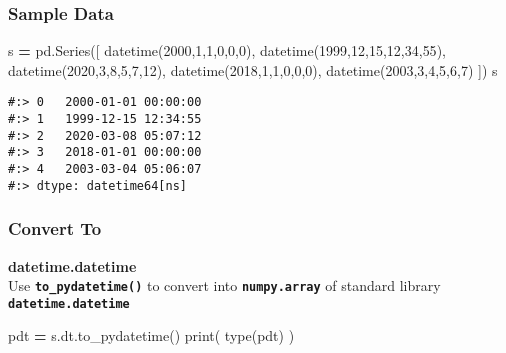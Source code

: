 \documentclass[
]{book}
\newenvironment{Shaded}{\begin{snugshade}}{\end{snugshade}}
\newcommand{\BuiltInTok}[1]{#1}
\newcommand{\DecValTok}[1]{\textcolor[rgb]{0.06,0.06,0.06}{#1}}
\newcommand{\NormalTok}[1]{#1}
\newcommand{\OperatorTok}[1]{\textcolor[rgb]{0.43,0.43,0.43}{\textbf{#1}}}
\begin{document}
\hypertarget{sample-data-5}{%
\subsubsection{Sample Data}\label{sample-data-5}}

\begin{Shaded}
\begin{Highlighting}[]
\NormalTok{s }\OperatorTok{=}\NormalTok{ pd.Series([}
\NormalTok{    datetime(}\DecValTok{2000}\NormalTok{,}\DecValTok{1}\NormalTok{,}\DecValTok{1}\NormalTok{,}\DecValTok{0}\NormalTok{,}\DecValTok{0}\NormalTok{,}\DecValTok{0}\NormalTok{),}
\NormalTok{    datetime(}\DecValTok{1999}\NormalTok{,}\DecValTok{12}\NormalTok{,}\DecValTok{15}\NormalTok{,}\DecValTok{12}\NormalTok{,}\DecValTok{34}\NormalTok{,}\DecValTok{55}\NormalTok{),}
\NormalTok{    datetime(}\DecValTok{2020}\NormalTok{,}\DecValTok{3}\NormalTok{,}\DecValTok{8}\NormalTok{,}\DecValTok{5}\NormalTok{,}\DecValTok{7}\NormalTok{,}\DecValTok{12}\NormalTok{),}
\NormalTok{    datetime(}\DecValTok{2018}\NormalTok{,}\DecValTok{1}\NormalTok{,}\DecValTok{1}\NormalTok{,}\DecValTok{0}\NormalTok{,}\DecValTok{0}\NormalTok{,}\DecValTok{0}\NormalTok{),}
\NormalTok{    datetime(}\DecValTok{2003}\NormalTok{,}\DecValTok{3}\NormalTok{,}\DecValTok{4}\NormalTok{,}\DecValTok{5}\NormalTok{,}\DecValTok{6}\NormalTok{,}\DecValTok{7}\NormalTok{)}
\NormalTok{])}
\NormalTok{s}
\end{Highlighting}
\end{Shaded}

\begin{verbatim}
#:> 0   2000-01-01 00:00:00
#:> 1   1999-12-15 12:34:55
#:> 2   2020-03-08 05:07:12
#:> 3   2018-01-01 00:00:00
#:> 4   2003-03-04 05:06:07
#:> dtype: datetime64[ns]
\end{verbatim}

\hypertarget{convert-to}{%
\subsubsection{Convert To}\label{convert-to}}

\textbf{datetime.datetime}\\
Use \textbf{\texttt{to\_pydatetime()}} to convert into \textbf{\texttt{numpy.array}} of standard library \textbf{\texttt{datetime.datetime}}

\begin{Shaded}
\begin{Highlighting}[]
\NormalTok{pdt  }\OperatorTok{=}\NormalTok{ s.dt.to\_pydatetime()}
\BuiltInTok{print}\NormalTok{( }\BuiltInTok{type}\NormalTok{(pdt) )}
\end{Highlighting}
\end{Shaded}
\end{document}
